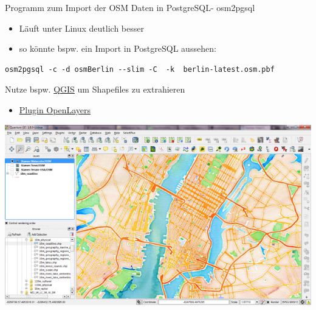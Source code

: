 \documentclass[ignorenonframetext,]{beamer}
\providecommand{\tightlist}{%
  \setlength{\itemsep}{0pt}\setlength{\parskip}{0pt}}
\begin{document}
\begin{frame}[fragile]{Programm zum Import der OSM Daten in PostgreSQL-
osm2pgsql}
\protect\hypertarget{programm-zum-import-der-osm-daten-in-postgresql--osm2pgsql}{}

\begin{itemize}
\tightlist
\item
  Läuft unter Linux deutlich besser
\item
  so könnte bspw. ein Import in PostgreSQL aussehen:
\end{itemize}

\begin{verbatim}
osm2pgsql -c -d osmBerlin --slim -C  -k  berlin-latest.osm.pbf
\end{verbatim}

\end{frame}

\begin{frame}{Nutze bspw. \href{http://www.qgis.org/de/site/}{QGIS} um
Shapefiles zu extrahieren}
\protect\hypertarget{nutze-bspw.-qgis-um-shapefiles-zu-extrahieren}{}

\begin{itemize}
\tightlist
\item
  \href{http://www.qgistutorials.com/de/docs/downloading_osm_data.html}{Plugin
  OpenLayers}
\end{itemize}

\includegraphics{figure/stamen_watercolor1.png}

\end{frame}
\end{document}
